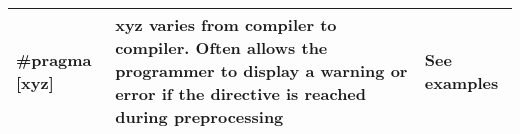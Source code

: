 \documentclass{article}
\begin{document}
\begin{center}
\begin{tabularx}{\textwidth}{
			| >{\raggedright\arraybackslash}X
			| >{\raggedright\arraybackslash}X
			| >{\raggedright\arraybackslash}X |
		}
		\hline
		\#pragma [xyz]                  & xyz varies from compiler to compiler. Often allows the programmer to display a warning or error if the directive is reached during preprocessing                                 & See examples                                                                                                                                                                                                                                                      \\
		\hline
	\end{tabularx}
\end{center}
\end{document}
